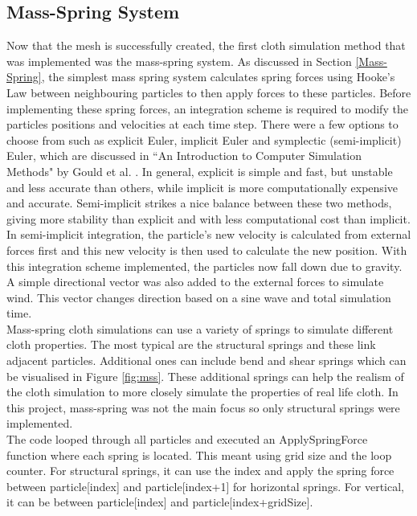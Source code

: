 \documentclass[12pt,a4paper]{article}
\begin{document}
\subsection{Mass-Spring System}
\label{mss-metho}
Now that the mesh is successfully created, the first cloth simulation method that was implemented was the mass-spring system. As discussed in Section \ref{Mass-Spring}, the simplest mass spring system calculates spring forces using Hooke's Law between neighbouring particles to then apply forces to these particles. Before implementing these spring forces, an integration scheme is required to modify the particles positions and velocities at each time step. There were a few options to choose from such as explicit Euler, implicit Euler and symplectic (semi-implicit) Euler, which are discussed in ``An Introduction to Computer Simulation Methods" by Gould et al. \cite{gould2007introduction}. In general, explicit is simple and fast, but unstable and less accurate than others, while implicit is more computationally expensive and accurate. Semi-implicit strikes a nice balance between these two methods, giving more stability than explicit and with less computational cost than implicit. In semi-implicit integration, the particle's new velocity is calculated from external forces first and this new velocity is then used to calculate the new position. With this integration scheme implemented, the particles now fall down due to gravity. A simple directional vector was also added to the external forces to simulate wind. This vector changes direction based on a sine wave and total simulation time.
\\

Mass-spring cloth simulations can use a variety of springs to simulate different cloth properties. The most typical are the structural springs and these link adjacent particles. Additional ones can include bend and shear springs which can be visualised in Figure \ref{fig:mss}. These additional springs can help the realism of the cloth simulation to more closely simulate the properties of real life cloth. In this project, mass-spring was not the main focus so only structural springs were implemented.
\\

The code looped through all particles and executed an ApplySpringForce function where each spring is located. This meant using grid size and the loop counter. For structural springs, it can use the index and apply the spring force between particle[index] and particle[index+1] for horizontal springs. For vertical, it can be between particle[index] and particle[index+gridSize]. \\
\end{document}
